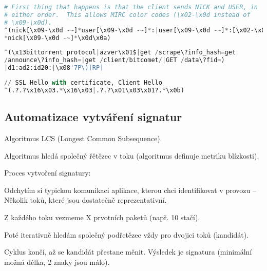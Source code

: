 
\noindent\begin{minipage}{\linewidth}
    \begin{lstlisting}[language=Python, caption={Příklad signatury pro detekci IRC. Pomocí regulárního výrazu je specifikována kostra řetězce.}]
# First thing that happens is that the client sends NICK and USER, in
# either order.  This allows MIRC color codes (\x02-\x0d instead of
# \x09-\x0d).
^(nick[\x09-\x0d -~]*user[\x09-\x0d -~]*:|user[\x09-\x0d -~]*:[\x02-\x0d -~]
*nick[\x09-\x0d -~]*\x0d\x0a)
\end{lstlisting}
\end{minipage}

\noindent\begin{minipage}{\linewidth}
    \begin{lstlisting}[language=Python, caption={Příklad signatury pro detekci BitTorrentu. Signatura je založená na klíčových slovech.}]
^(\x13bittorrent protocol|azver\x01$|get /scrape\?info_hash=get
/announce\?info_hash=|get /client/bitcomet/|GET /data\?fid=)
|d1:ad2:id20:|\x08'7P\)[RP]
\end{lstlisting}
\end{minipage}

\noindent\begin{minipage}{\linewidth}
    \begin{lstlisting}[language=Python, caption={Příklad signatury pro detekci SSL provozu. Detekce Client Hello paketu, kdy se vyměňují informace o šifrování.}]
// SSL Hello with certificate, Client Hello
^(.?.?\x16\x03.*\x16\x03|.?.?\x01\x03\x01?.*\x0b)
\end{lstlisting}
\end{minipage}

\subsection*{Automatizace vytváření signatur}

\begin{compactitem}
    \item Algoritmus LCS (Longest Common Subsequence).
    \item Algoritmus hledá  společný řětězec v toku (algoritmus definuje metriku blízkosti).
    \item Proces vytvoření signatury: \begin{compactitem}
        \item Odchytím si typickou komunikaci aplikace, kterou chci identifikovat v provozu -- Několik toků, které jsou dostatečně reprezentativní.
        \item Z každého toku vezmeme X prvotních paketů (např. 10 stačí).
        \item Poté iterativně hledám  společný podřetězec vždy pro dvojici toků (kandidát).
        \item Cyklus končí, až se kandidát přestane měnit. Výsledek je signatura (minimální možná délka, 2 znaky jsou málo).
    \end{compactitem}
\end{compactitem}

